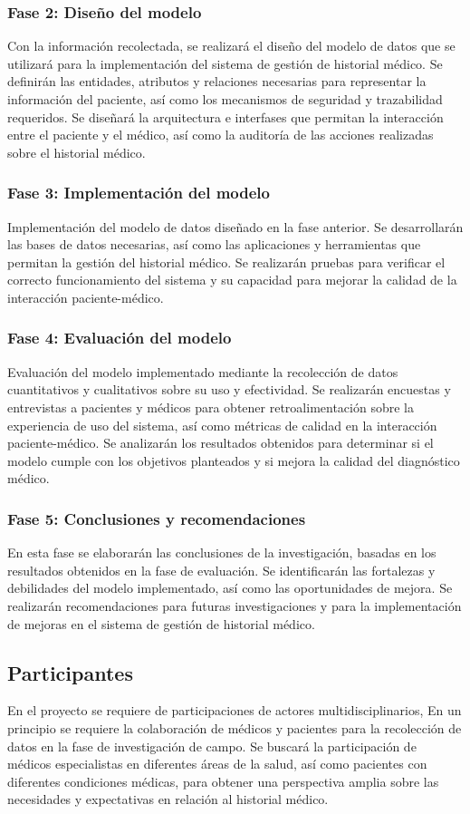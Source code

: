     \subsubsection{Fase 2: Diseño del modelo}
    Con la información recolectada, se realizará el diseño del  modelo de datos que se utilizará para la implementación del sistema de gestión de historial médico. Se definirán las entidades, atributos y relaciones necesarias para representar la información del paciente, así como los mecanismos de seguridad y trazabilidad requeridos. Se diseñará la arquitectura e interfases que permitan la interacción entre el paciente y el médico, así como la auditoría de las acciones realizadas sobre el historial médico.
    \subsubsection{Fase 3: Implementación del modelo}
    Implementación del modelo de datos diseñado en la fase anterior. Se desarrollarán las bases de datos necesarias, así como las aplicaciones y herramientas que permitan la gestión del historial médico. Se realizarán pruebas para verificar el correcto funcionamiento del sistema y su capacidad para mejorar la calidad de la interacción paciente-médico.
    \subsubsection{Fase 4: Evaluación del modelo}
    Evaluación del modelo implementado mediante la recolección de datos cuantitativos y cualitativos sobre su uso y efectividad. Se realizarán encuestas y entrevistas a pacientes y médicos para obtener retroalimentación sobre la experiencia de uso del sistema, así como métricas de calidad en la interacción paciente-médico. Se analizarán los resultados obtenidos para determinar si el modelo cumple con los objetivos planteados y si mejora la calidad del diagnóstico médico.
    \subsubsection{Fase 5: Conclusiones y recomendaciones}
    En esta fase se elaborarán las conclusiones de la investigación, basadas en los resultados obtenidos en la fase de evaluación. Se identificarán las fortalezas y debilidades del modelo implementado, así como las oportunidades de mejora. Se realizarán recomendaciones para futuras investigaciones y para la implementación de mejoras en el sistema de gestión de historial médico.    
    \subsection{Participantes}
    En el proyecto se requiere de participaciones de actores multidisciplinarios, En un principio se requiere la colaboración de médicos y pacientes para la recolección de datos en la fase de investigación de campo. Se buscará la participación de médicos especialistas en diferentes áreas de la salud, así como pacientes con diferentes condiciones médicas, para obtener una perspectiva amplia sobre las necesidades y expectativas en relación al historial médico.

